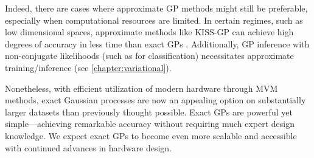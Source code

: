 Indeed, there are cases where approximate GP methods might still be preferable, especially when computational resources are limited.
In certain regimes, such as low dimensional spaces, approximate methods like KISS-GP can achieve high degrees of accuracy in less time than exact GPs \cite{wilson2015kernel}.
Additionally, GP inference with non-conjugate likelihoods (such as for classification) necessitates approximate training/inference (see \cref{chapter:variational}).

Nonetheless, with efficient utilization of modern hardware through MVM methods, exact Gaussian processes are now an appealing option on substantially larger datasets than previously thought possible.
Exact GPs are powerful yet simple---achieving remarkable accuracy without requiring much expert design knowledge.
We expect exact GPs to become even more scalable and accessible with continued advances in hardware design.
